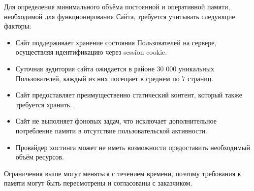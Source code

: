 
Для определения минимального объёма постоянной и оперативной памяти, необходимой для функционирования Сайта, требуется учитывать следующие факторы:

\begin{itemize}
  \item Сайт поддерживает хранение состояния Пользователей на сервере, осуществляя идентификацию через session cookie.
  \item Суточная аудитория сайта ожидается в районе 30 000 уникальных Пользователей, каждый из них посещает в среднем по 7 страниц.
  \item Сайт предоставляет преимущественно статический контент, который также требуется хранить.
  \item Сайт не выполняет фоновых задач, что исключает дополнительное потребление памяти в отсутствие пользовательской активности.
  \item Провайдер хостинга может не иметь возможности предоставить необходимый объём ресурсов.
\end{itemize}

Ограничения выше могут меняться с течением времени, поэтому требования к памяти могут быть пересмотрены и согласованы с заказчиком.